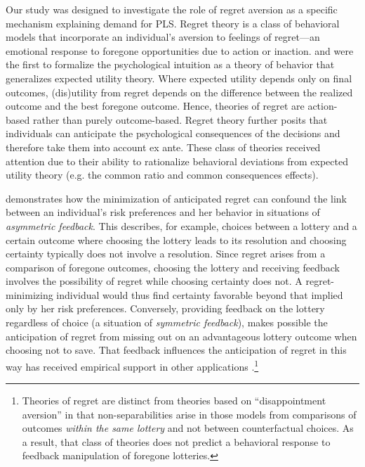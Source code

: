 \documentclass[11pt]{article}
\begin{document}
		Our study was designed to investigate the role of regret aversion as a specific mechanism explaining demand for PLS. Regret theory is a class of behavioral models that incorporate an individual's aversion to feelings of regret---an emotional response to foregone opportunities due to action or inaction. \textcite{bell_risk_1983} and \textcite{loomes_regret_1982} were the first to formalize the psychological intuition as a theory of behavior that generalizes expected utility theory. Where expected utility depends only on final outcomes, (dis)utility from regret depends on the difference between the realized outcome and the best foregone outcome. Hence, theories of regret are action-based rather than purely outcome-based. Regret theory further posits that individuals can anticipate the psychological consequences of the decisions and therefore take them into account ex ante. These class of theories received attention due to their ability to rationalize behavioral deviations from expected utility theory (e.g. the common ratio and common consequences effects).

		\textcite{zeelenberg_consequences_1996} demonstrates how the minimization of anticipated regret can confound the link between an individual's risk preferences and her behavior in situations of \emph{asymmetric feedback}. This describes, for example, choices between a lottery and a certain outcome where choosing the lottery leads to its resolution and choosing certainty typically does not involve a resolution. Since regret arises from a comparison of foregone outcomes, choosing the lottery and receiving feedback involves the possibility of regret while choosing certainty does not. A regret-minimizing individual would thus find certainty favorable beyond that implied only by her risk preferences. Conversely, providing feedback on the lottery regardless of choice (a situation of \emph{symmetric feedback}), makes possible the anticipation of regret from missing out on an advantageous lottery outcome when choosing not to save. That feedback influences the anticipation of regret in this way has received empirical support in other applications \parencite{somasundaram_regret_2017,filiz-ozbay_auctions_2007,zeelenberg_consequences_2004}.\footnote{Theories of regret are distinct from theories based on ``disappointment aversion'' \parencite{gul_theory_1991} in that non-separabilities arise in those models from comparisons of outcomes \emph{within the same lottery} and not between counterfactual choices. As a result, that class of theories does not predict a behavioral response to feedback manipulation of foregone lotteries.}
\end{document}
